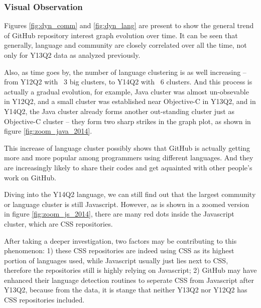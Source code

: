 \documentclass[11pt]{article}
\begin{document}
\subsubsection{Visual Observation}

Figures \ref{fig:dyn_comm} and \ref{fig:dyn_lang} are present to show the general trend of GitHub repository interest graph evolution over time.
It can be seen that generally, language and community are closely correlated over all the time, not only for Y13Q2 data as analyzed previously.

Also, as time goes by, the number of language clustering is as well increasing -- from Y12Q2 with ~3 big clusters, to Y14Q2 with ~6 clusters. 
And this process is actually a gradual evolution, for example, Java cluster was almost un-obsevable in Y12Q2, and a small cluster was established near Objective-C in Y13Q2, and in Y14Q2, the Java cluster already forms another out-standing cluster just as Objective-C cluster -- they form two sharp strikes in the graph plot, as shown in figure \ref{fig:zoom_java_2014}. 

This increase of language cluster possibly shows that GitHub is actually getting more and more popular among programmers using different languages. And they are increasingly likely to share their codes and get aquainted with other people's work on GitHub.


Diving into the Y14Q2 language, we can still find out that the largest community or language cluster is still Javascript. However, as is shown in a zoomed version in figure \ref{fig:zoom_js_2014}, there are many red dots inside the Javascript cluster, which are CSS repositories. 

After taking a deeper investigation, two factors may be contributing to this phenomenon: 
1) these CSS repositories are indeed using CSS as its highest portion of languages used, while Javascript usually just lies next to CSS, therefore the repositories still is highly relying on Javascript; 2) GitHub may have enhanced their language detection routines to seperate CSS from Javascript after Y13Q2, because from the data, it is stange that neither Y13Q2 nor Y12Q2 has CSS repositories included.
\end{document}
